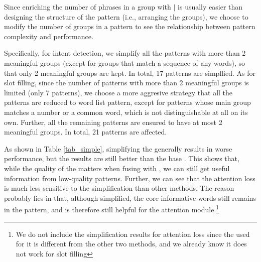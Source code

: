 Since enriching the number of phrases in a group with $|$ is usually easier than designing the structure of the pattern (i.e., arranging the groups), we choose to modify the number of groups in a pattern to see the relationship between pattern complexity and performance.

Specifically, for intent detection, we simplify all the patterns with more than 2 meaningful groups (except for groups that match a sequence of any words), so that only 2 meaningful groups are kept. In total, 17 patterns are simplfied. 
As for slot filling, since the number of patterns with more than 2 meaningful groups is limited (only 7 patterns), we choose a more aggresive strategy that all the patterns are reduced to word list pattern, except for patterns whose main group matches a number or a common word, which is not distinguishable at all on its own. Further, all the remaining patterns are ensured to have at most 2 meaningful groups. In total, 21 patterns are affected.

As shown in Table \ref{tab_simple}, simplifying the \RE generally results in worse performance, but the results are still better than the base \BLSTM. This shows that, while the quality of the \RE matters when fusing with \NN, we can still get useful information from low-quality patterns. Further, we can see that the attention loss is much less sensitive to the simplification than other methods. The reason probably lies in that, although simplified, the core informative words still remains in the pattern, and is therefore still helpful for the attention module.\footnote{We do not include the simplification results for attention loss since the \RE used for it is different from the other two methods, and we already know it does not work for slot filling} 






